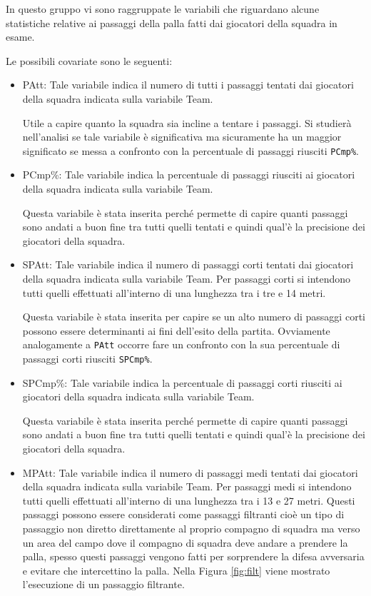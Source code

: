 In questo gruppo vi sono raggruppate le variabili che riguardano alcune statistiche relative ai passaggi della palla fatti dai giocatori della squadra in esame.

Le possibili covariate sono le seguenti:
\begin{itemize}
	
	
	\item \textsf{PAtt}: Tale variabile indica il numero di tutti i passaggi tentati dai giocatori della squadra indicata sulla variabile \textsf{Team}. 
	
	Utile a capire quanto la squadra sia incline a tentare i passaggi. Si studierà nell'analisi se tale variabile è significativa ma sicuramente ha un maggior significato se messa a confronto con la percentuale di passaggi riusciti \texttt{PCmp\%}.
	\item\textsf{PCmp\%}: Tale variabile indica la percentuale di passaggi riusciti ai giocatori della squadra indicata sulla variabile \textsf{Team}. 
	
	Questa variabile è stata inserita perché permette di capire quanti passaggi sono andati a buon fine tra tutti quelli tentati e quindi qual'è la precisione dei giocatori della squadra.
	\item \textsf{SPAtt}: Tale variabile indica il numero di passaggi corti tentati dai giocatori della squadra indicata sulla variabile \textsf{Team}. Per passaggi corti si intendono tutti quelli effettuati all'interno di una lunghezza tra i tre e 14 metri.
	
	Questa variabile è stata inserita per capire se un alto numero di passaggi corti possono essere determinanti ai fini dell'esito della partita. Ovviamente analogamente a \texttt{PAtt} occorre fare un confronto con la sua percentuale di passaggi corti riusciti \texttt{SPCmp\%}.
	\item \textsf{SPCmp\%}: Tale variabile indica la percentuale di passaggi corti riusciti ai giocatori della squadra indicata sulla variabile \textsf{Team}. 
	
	Questa variabile è stata inserita perché permette di capire quanti passaggi sono andati a buon fine tra tutti quelli tentati e quindi qual'è la precisione dei giocatori della squadra.
	\item \textsf{MPAtt}: Tale variabile indica il numero di passaggi medi tentati dai giocatori della squadra indicata sulla variabile \textsf{Team}. Per passaggi medi si intendono tutti quelli effettuati all'interno di una lunghezza tra i 13 e 27 metri. Questi passaggi possono essere considerati come passaggi filtranti cioè un tipo di passaggio non diretto direttamente al proprio compagno di squadra ma verso un area del campo dove il compagno di squadra deve andare a prendere la palla, spesso questi passaggi vengono fatti per sorprendere la difesa avversaria e evitare che intercettino la palla. Nella Figura \ref{fig:filt} viene mostrato l'esecuzione di un passaggio filtrante.
	

\end{itemize}
